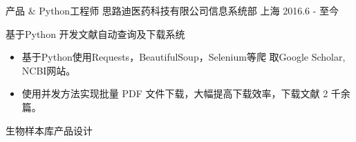 

\begin{cventries}

  \cventry
    {产品 \& Python工程师} %
    {思路迪医药科技有限公司{\enskip\cdotp\enskip}信息系统部} %
    {上海} %
    {2016.6 - 至今} %
    {
      \begin{cvitems} %
        \item 基于Python 开发文献自动查询及下载系统 
        \begin{itemize}
        	\item 基于Python使用Requests，BeautifulSoup，Selenium等爬
        	取Google Scholar, NCBI网站。
        	\item 使用并发方法实现批量 PDF 文件下载，大幅提高下载效率，下载文献 2 千余篇。
        \end{itemize}
        \item 生物样本库产品设计
      \end{cvitems}
    }

 
\end{cventries}
